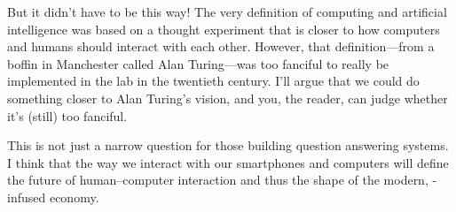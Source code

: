 But it didn't have to be this way!
%
The very definition of computing and artificial intelligence was based on a
thought experiment that is closer to how computers and humans should interact
with each other.
%
However, that definition---from a boffin in Manchester called Alan
Turing---was too fanciful to really be implemented in the lab in the
twentieth century.
%
I'll argue that we could do something closer to Alan Turing's vision,
and you, the reader, can judge whether it's (still) too fanciful.

This is not just a narrow question for those building question
answering systems.
%
I think that the way we interact with our smartphones and computers
will define the future of human--computer interaction and
thus the shape of the modern, -infused economy.


